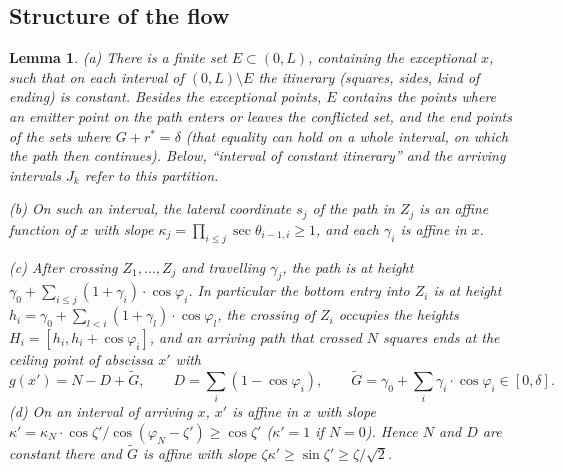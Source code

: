 \documentclass[11pt,letterpaper]{amsart}
\theoremstyle{plain}
\newtheorem{lemma}[theorem]{Lemma}
\theoremstyle{definition}
\theoremstyle{remark}
\begin{document}
\subsection{Structure of the flow}
\begin{lemma}\label{lem:sstructure}
\textup{(a)} There is a finite set $E\subset(0,L)$, containing the exceptional $x$, such that on each interval of $(0,L)\setminus E$ the itinerary (squares, sides, kind of ending) is constant. Besides the exceptional points, $E$ contains the points where an emitter point on the path enters or leaves the conflicted set, and the end points of the sets where $G+r^*=\delta$ (that equality can hold on a whole interval, on which the path then continues). Below, ``interval of constant itinerary'' and the arriving intervals $J_k$ refer to this partition.

\textup{(b)} On such an interval, the lateral coordinate $s_j$ of the path in $Z_j$ is an affine function of $x$ with slope $\kappa_j=\prod_{i\le j}\sec\theta_{i-1,i}\ge1$, and each $\gamma_i$ is affine in $x$.

\textup{(c)} After crossing $Z_1,\ldots,Z_j$ and travelling $\gamma_j$, the path is at height $\gamma_0+\sum_{i\le j}(1+\gamma_i)\cdot\cos\varphi_i$. In particular the bottom entry into $Z_i$ is at height $h_i=\gamma_0+\sum_{l<i}(1+\gamma_l)\cdot\cos\varphi_l$, the crossing of $Z_i$ occupies the heights $H_i=[h_i,h_i+\cos\varphi_i]$, and an arriving path that crossed $N$ squares ends at the ceiling point of abscissa $x'$ with
\begin{equation}\label{eq:sheight}
g(x')=N-D+\widetilde G,\qquad D=\sum_i(1-\cos\varphi_i),\qquad\widetilde G=\gamma_0+\sum_i\gamma_i\cdot\cos\varphi_i\in[0,\delta].
\end{equation}
\textup{(d)} On an interval of arriving $x$, $x'$ is affine in $x$ with slope $\kappa'=\kappa_N\cdot\cos\zeta'/\cos(\varphi_N-\zeta')\ge\cos\zeta'$ ($\kappa'=1$ if $N=0$). Hence $N$ and $D$ are constant there and $\widetilde G$ is affine with slope $\zeta\kappa'\ge\sin\zeta'\ge\zeta/\sqrt2$.
\end{lemma}
\end{document}
